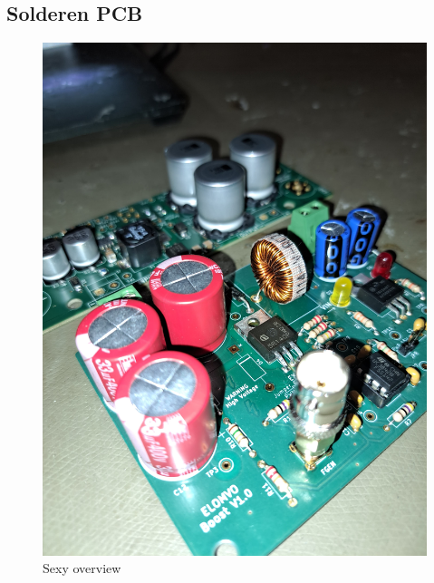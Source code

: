 \subsection{Solderen PCB}

\begin{figure}[!h]
    \centering
    \includegraphics[width=0.5\linewidth]{img//hfd5/WhatsApp Image 2024-10-27 at 23.40.52_0f53b54c.jpg}
    \caption{Sexy overview}
    \label{fig:zwartepiemels}
\end{figure}